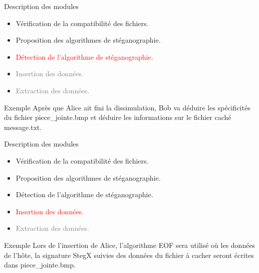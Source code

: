 \documentclass{beamer}
\begin{document}
  \begin{frame} %
	\begin{block}{Description des modules}
	\begin{itemize}
	[circle]
	\item Vérification de la compatibilité des fichiers.
	\item Proposition des algorithmes de stéganographie.
	\item \textcolor{red} {Détection de l'algorithme de stéganographie.}
	\item \textcolor{gray} {Insertion des données.}
	\item \textcolor{gray} {Extraction des données.}
	\end{itemize}
	\end{block}
	
	\begin{exampleblock}{Exemple} 
	Après que Alice ait fini la dissimulation, Bob va déduire les spécificités
	du fichier piece\_jointe.bmp et déduire les informations sur le fichier 
	caché message.txt. 
	\end{exampleblock}
  \end{frame}
  
  \begin{frame} %
	\begin{block}{Description des modules}
	\begin{itemize}
	[circle]
	\item Vérification de la compatibilité des fichiers.
	\item Proposition des algorithmes de stéganographie.
	\item Détection de l'algorithme de stéganographie.
	\item \textcolor{red}{Insertion des données.}
	\item \textcolor{gray} {Extraction des données.}
	\end{itemize}
	\end{block}
	
	\begin{exampleblock}{Exemple} 
	Lors de l'insertion de Alice, l'algorithme EOF sera utilisé où 
	les données de l'hôte, la signature StegX suivies des données du fichier 
	à cacher seront écrites dans piece\_jointe.bmp. 
	\end{exampleblock}
  \end{frame}
  
\end{document}
